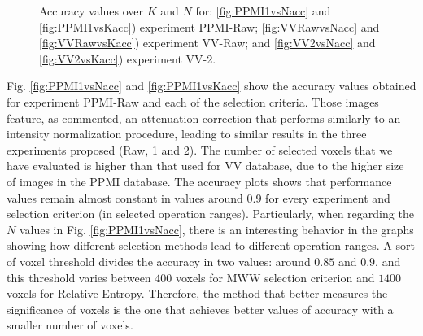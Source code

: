 \begin{figure}
		
		\caption{Accuracy values over $K$ and $N$ for: \ref{fig:PPMI1vsNacc} and \ref{fig:PPMI1vsKacc}) experiment PPMI-Raw; \ref{fig:VVRawvsNacc} and \ref{fig:VVRawvsKacc}) experiment VV-Raw; and \ref{fig:VV2vsNacc} and \ref{fig:VV2vsKacc}) experiment VV-2.} 
		\label{fig:accExperimentsWithouthMask}
	\end{figure}
	
	Fig. \ref{fig:PPMI1vsNacc} and \ref{fig:PPMI1vsKacc} show the accuracy values obtained for experiment PPMI-Raw and each of the selection criteria. Those images feature, as commented, an attenuation correction that performs similarly to an intensity normalization procedure, leading to similar results in the three experiments proposed (Raw, 1 and 2). The number of selected voxels that we have evaluated is higher than that used for VV database, due to the higher size of images in the PPMI database. The accuracy plots shows that performance values remain almost constant in values around $0.9$ for every experiment and selection criterion (in selected operation ranges). Particularly, when regarding the $N$ values in Fig. \ref{fig:PPMI1vsNacc}, there is an interesting behavior in the graphs showing how different selection methods lead to different operation ranges. A sort of voxel threshold divides the accuracy in two values: around $0.85$ and $0.9$, and this threshold varies between $400$ voxels for MWW selection criterion and $1400$ voxels for Relative Entropy. Therefore, the method that better measures the significance of voxels is the one that achieves better values of accuracy with a smaller number of voxels. 
	
